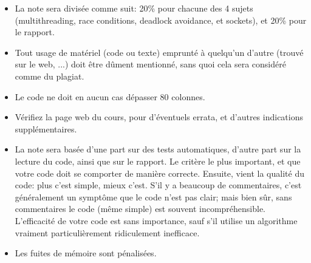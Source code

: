 \documentclass{article}
\begin{document}
\begin{itemize}
  \item La note sera divisée comme suit: 20\% pour chacune des
    4 sujets (multithreading, race conditions, deadlock avoidance, et sockets), et 20\% pour le rapport.
  \item Tout usage de matériel (code ou texte) emprunté à quelqu'un d'autre
    (trouvé sur le web, ...) doit être dûment mentionné, sans quoi cela sera
    considéré comme du plagiat.
  \item Le code ne doit en aucun cas dépasser 80 colonnes.
  \item Vérifiez la page web du cours, pour d'éventuels errata, et d'autres
    indications supplémentaires.
  \item La note sera basée d'une part sur des tests automatiques, d'autre part
    sur la lecture du code, ainsi que sur le rapport.  Le critère le plus
    important, et que votre code doit se comporter de manière correcte.
    Ensuite, vient la qualité du code: plus c'est simple, mieux c'est.
    S'il y a beaucoup de commentaires, c'est généralement un symptôme que le
    code n'est pas clair; mais bien sûr, sans commentaires le code (même
    simple) est souvent incompréhensible.  L'efficacité de votre code est sans
    importance, sauf s'il utilise un algorithme vraiment particulièrement
    ridiculement inefficace.
  \item Les fuites de mémoire sont pénalisées.
\end{itemize}
\end{document}
